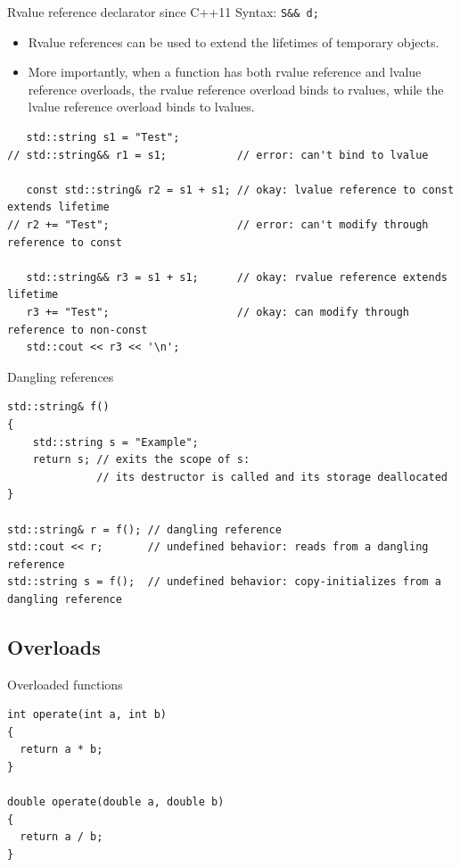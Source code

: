 \documentclass{beamer}
\begin{document}
\begin{frame}[fragile]{Rvalue reference declarator}
{\small since C++11}
Syntax: \lstinline{S&& d;}
\begin{itemize}
  \item Rvalue references can be used to extend the lifetimes of temporary
  objects.
  \item More importantly, when a function has both rvalue reference and lvalue
  reference overloads, the rvalue reference overload binds to rvalues, while the
  lvalue reference overload binds to lvalues. 
\end{itemize}

\begin{lstlisting}
   std::string s1 = "Test";
// std::string&& r1 = s1;           // error: can't bind to lvalue
 
   const std::string& r2 = s1 + s1; // okay: lvalue reference to const extends lifetime
// r2 += "Test";                    // error: can't modify through reference to const
 
   std::string&& r3 = s1 + s1;      // okay: rvalue reference extends lifetime
   r3 += "Test";                    // okay: can modify through reference to non-const
   std::cout << r3 << '\n';
\end{lstlisting}
\end{frame}

\begin{frame}[fragile]{Dangling references}
\begin{lstlisting}
std::string& f()
{
    std::string s = "Example";
    return s; // exits the scope of s:
              // its destructor is called and its storage deallocated
}
 
std::string& r = f(); // dangling reference
std::cout << r;       // undefined behavior: reads from a dangling reference
std::string s = f();  // undefined behavior: copy-initializes from a dangling reference
\end{lstlisting}
\end{frame}

\subsection{Overloads}
\begin{frame}[fragile]{Overloaded functions}
\begin{lstlisting}[caption=Overloaded functions]
int operate(int a, int b)
{
  return a * b;
}

double operate(double a, double b)
{
  return a / b;
}
\end{lstlisting}
\end{frame}
\end{document}
